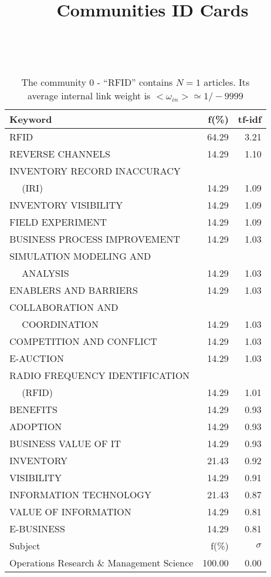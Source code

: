 \documentclass[a4paper,11pt]{report}
\title{{\bf Communities ID Cards}}
\date{\begin{flushleft}This document gather the ``ID Cards'' of the CC communities found within your database.\\
 The CC network was built by keeping a link between articles sharing at least 5 references. The communities characterized here correspond to the ones found in the level 0 (in the sense of the Louvain algo) which gathers more than 0 articles.\\
 These ID cards displays the most frequent keywords, subject categories, journals of publication, institution, countries, authors, references and reference journals of the articles of each community. The significance of an item $\sigma = \sqrt{N} (f - p) / \sqrt{p(1-p)}$ [where $N$ is the number of articles within the community and $f$ and $p$ are the proportion of articles respectively within the community and within the database displaying that item ] is also given (for example $\sigma > 5$ is really highly significant). The tf-idf value which can be calculated by $tf-idf = f*log(frac{1}{p})$ is also given.\\
\vspace{1cm}
\copyright Sebastian Grauwin, Liu Weizhi - (2014) \end{flushleft}}
\begin{document}
\begin{landscape}
\maketitle
\clearpage

\begin{table}[!ht]
\caption{The community 0 - ``RFID'' contains $N = 1$ articles. Its average internal link weight is $<\omega_{in}> \simeq 1/-9999$ }
\textcolor{white}{aa}\\
{\scriptsize\begin{tabular}{|l r  r|}
\hline
Keyword & f(\%) & tf-idf \\
\hline
RFID & 64.29 & 3.21\\
REVERSE CHANNELS & 14.29 & 1.10\\
INVENTORY RECORD INACCURACY &  &\\
$\quad$ (IRI) & 14.29 & 1.09\\
INVENTORY VISIBILITY & 14.29 & 1.09\\
FIELD EXPERIMENT & 14.29 & 1.09\\
BUSINESS PROCESS IMPROVEMENT & 14.29 & 1.03\\
SIMULATION MODELING AND &  &\\
$\quad$ ANALYSIS & 14.29 & 1.03\\
ENABLERS AND BARRIERS & 14.29 & 1.03\\
COLLABORATION AND &  &\\
$\quad$ COORDINATION & 14.29 & 1.03\\
COMPETITION AND CONFLICT & 14.29 & 1.03\\
E-AUCTION & 14.29 & 1.03\\
RADIO FREQUENCY IDENTIFICATION &  &\\
$\quad$ (RFID) & 14.29 & 1.01\\
BENEFITS & 14.29 & 0.93\\
ADOPTION & 14.29 & 0.93\\
BUSINESS VALUE OF IT & 14.29 & 0.93\\
INVENTORY & 21.43 & 0.92\\
VISIBILITY & 14.29 & 0.91\\
INFORMATION TECHNOLOGY & 21.43 & 0.87\\
VALUE OF INFORMATION & 14.29 & 0.81\\
E-BUSINESS & 14.29 & 0.81\\
\hline
\hline
Subject & f(\%) & $\sigma$\\
\hline
Operations Research \& Management Science & 100.00 & 0.00\\

\end{tabular}}
\end{table}
\end{landscape}
\end{document}
